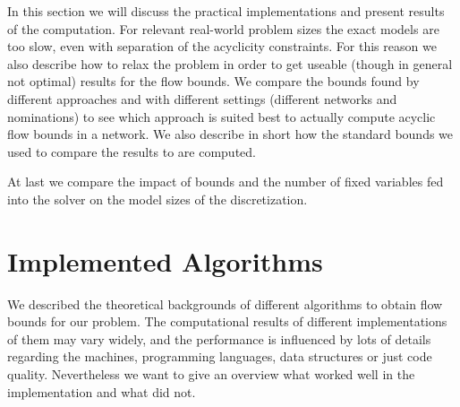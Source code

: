 In this section we will discuss the practical implementations and present results of the computation. For relevant 
real-world problem sizes the exact models are too slow, even with separation of the acyclicity constraints. For this 
reason we also describe how to relax the problem in order to get useable (though in general not optimal) results for the 
flow bounds. 
We compare the bounds found by different approaches and with different settings (different networks and nominations) 
to see which approach is suited best to actually compute acyclic flow bounds in a network. We also describe in short 
how the standard bounds we used to compare the results to are computed. 

At last we compare the impact of bounds and the number of fixed variables fed into the solver on the model sizes of the 
discretization. \\

\section{Implemented Algorithms}

We described the theoretical backgrounds of different algorithms to obtain flow bounds for our problem. The 
computational results of different implementations of them may vary widely, and the performance is influenced by lots 
of details regarding the machines, programming languages, data structures or just code quality. Nevertheless we want 
to give an overview what worked well in the implementation and what did not.\\

